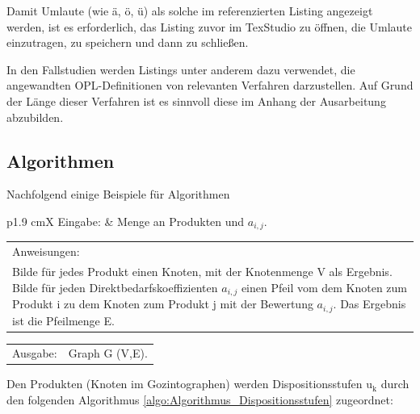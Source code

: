 \documentclass[13pt,a4paper, listof=entryprefix, bibliography=totocnumbered,toc=listofnumbered,lof=listofnumbered]{scrartcl}
\begin{document}
Damit Umlaute (wie ä, ö, ü) als solche im referenzierten Listing angezeigt werden, ist es erforderlich, das Listing zuvor im TexStudio zu öffnen, die Umlaute einzutragen, zu speichern und dann zu schließen.


In den Fallstudien werden Listings unter anderem dazu verwendet, die angewandten OPL-Definitionen von relevanten Verfahren darzustellen. Auf Grund der Länge dieser Verfahren ist es sinnvoll diese im Anhang der Ausarbeitung abzubilden.

\subsection{Algorithmen}
Nachfolgend einige Beispiele für Algorithmen \\


\begin{algorithmic}
	\label{algo:Algorithmus_Gozintograph}
	\STATE
	\begin{tabularx}{\linewidth}{p{1.9 cm}X}
		\hspace*{1 mm} Eingabe: & Menge an Produkten und $a_{i,j}$.
	\end{tabularx}
	\addtocounter{table}{-1} %
	\begin{tabularx}{\linewidth}{X}
		Anweisungen: \\
		Bilde für jedes Produkt einen Knoten, mit der Knotenmenge V als Ergebnis. Bilde für jeden Direktbedarfskoeffizienten $a_{i,j}$ einen Pfeil vom dem Knoten zum Produkt i zu dem Knoten zum Produkt j mit der Bewertung $a_{i,j}$. Das Ergebnis ist die Pfeilmenge E.
	\end{tabularx}
	\begin{tabularx}{\linewidth}{p{1.9 cm}X}
		\hspace*{1 mm} Ausgabe: & Graph G (V,E).
	\end{tabularx}
	\addtocounter{table}{-1} %
\end{algorithmic}

Den Produkten (Knoten im Gozintographen) werden Dispositionsstufen $\mathrm{u_{k}}$ durch den folgenden Algorithmus \ref{algo:Algorithmus_Dispositionsstufen} zugeordnet: \\

\end{document}
